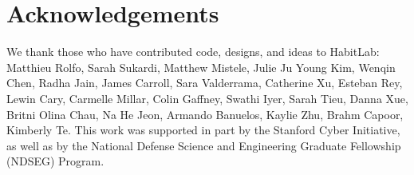 \section{Acknowledgements}

We thank those who have contributed code, designs, and ideas to HabitLab: Matthieu Rolfo, Sarah Sukardi, Matthew Mistele, Julie Ju Young Kim, Wenqin Chen, Radha Jain, James Carroll, Sara Valderrama, Catherine Xu, Esteban Rey, Lewin Cary, Carmelle Millar, Colin Gaffney, Swathi Iyer, Sarah Tieu, Danna Xue, Britni Olina Chau, Na He Jeon, Armando Banuelos, Kaylie Zhu, Brahm Capoor, Kimberly Te. This work was supported in part by the Stanford Cyber Initiative, as well as by the National Defense Science and Engineering Graduate Fellowship (NDSEG) Program.
